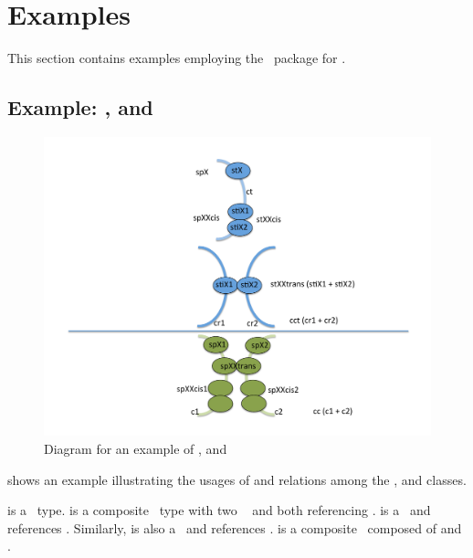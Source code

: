 
\section{Examples}
\label{def:Examples}

This section contains examples employing the \multi\ package for \SbmlLevelThree.

\subsection{Example: \ExCompartment, \SpeciesType and \ExSpecies}
\label{def:Example:CompartmentSpeciesTypeSpecies}

\begin{figure}[htb]
  \includegraphics[scale=0.5]{./figs/example_ppt}
  \caption{Diagram for an example of \ExCompartment, \SpeciesType and 
    \ExSpecies}
  \label{fig:Example:CompartmentSpeciesTypeSpecies}
\end{figure}

 shows an example illustrating the usages of and relations among the \ExCompartment, \SpeciesType and \ExSpecies classes. 

 is a \compartment\ type.  is a composite \compartment\ type with two \compartmentReferences\  and  both referencing .  is a \notatypecompartment\ and references . Similarly,  is also a \notatypecompartment\ and references .  is a composite \notatypecompartment\ composed of  and .


